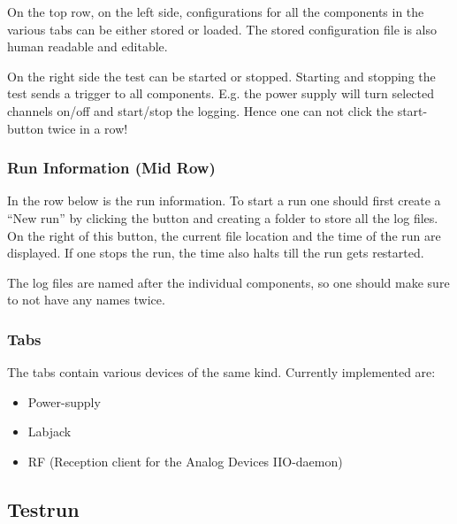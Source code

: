 \documentclass[10pt,a4paper]{article}
\begin{document}
	On the top row, on the left side, configurations for all the components in the various tabs can be either stored or loaded. The stored configuration file is also human readable and editable.
	
	\bigbreak
	
	On the right side the test can be started or stopped. Starting and stopping the test sends a trigger to all components. E.g. the power supply will turn selected channels on/off and start/stop the logging. Hence one can not click the start-button twice in a row!
	
	\subsubsection{Run Information (Mid Row)}
	
	In the row below is the run information. To start a run one should first create a \enquote{New run} by clicking the button and creating a folder to store all the log files. On the right of this button, the current file location and the time of the run are displayed. If one stops the run, the time also halts till the run gets restarted. 

	\bigbreak	
	
	The log files are named after the individual components, so one should make sure to not have any names twice.
	
	\subsubsection{Tabs}
	
	The tabs contain various devices of the same kind. Currently implemented are:
	
	\begin{itemize}
	\item Power-supply
	\item Labjack
	\item RF (Reception client for the Analog Devices IIO-daemon)
	\end{itemize}		
	
	\subsection{Testrun}	
	
\end{document}
